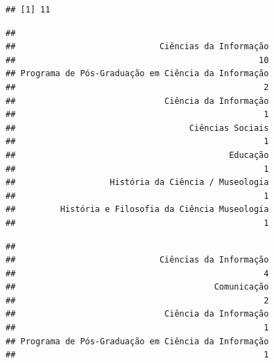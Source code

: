 \documentclass[]{article}
\newenvironment{Shaded}{\begin{snugshade}}{\end{snugshade}}
\newcommand{\KeywordTok}[1]{\textcolor[rgb]{0.13,0.29,0.53}{\textbf{#1}}}
\newcommand{\DataTypeTok}[1]{\textcolor[rgb]{0.13,0.29,0.53}{#1}}
\newcommand{\DecValTok}[1]{\textcolor[rgb]{0.00,0.00,0.81}{#1}}
\newcommand{\StringTok}[1]{\textcolor[rgb]{0.31,0.60,0.02}{#1}}
\newcommand{\OtherTok}[1]{\textcolor[rgb]{0.56,0.35,0.01}{#1}}
\newcommand{\OperatorTok}[1]{\textcolor[rgb]{0.81,0.36,0.00}{\textbf{#1}}}
\newcommand{\NormalTok}[1]{#1}
\begin{document}
\begin{verbatim}
## [1] 11
\end{verbatim}

\begin{Shaded}
\end{Shaded}

\begin{verbatim}
## 
##                             Ciências da Informação 
##                                                 10 
## Programa de Pós-Graduação em Ciência da Informação 
##                                                  2 
##                              Ciência da Informação 
##                                                  1 
##                                   Ciências Sociais 
##                                                  1 
##                                           Educação 
##                                                  1 
##                   História da Ciência / Museologia 
##                                                  1 
##         História e Filosofia da Ciência Museologia 
##                                                  1
\end{verbatim}

\begin{Shaded}
\end{Shaded}

\begin{verbatim}
## 
##                             Ciências da Informação 
##                                                  4 
##                                        Comunicação 
##                                                  2 
##                              Ciência da Informação 
##                                                  1 
## Programa de Pós-Graduação em Ciência da Informação 
##                                                  1
\end{verbatim}
\end{document}
